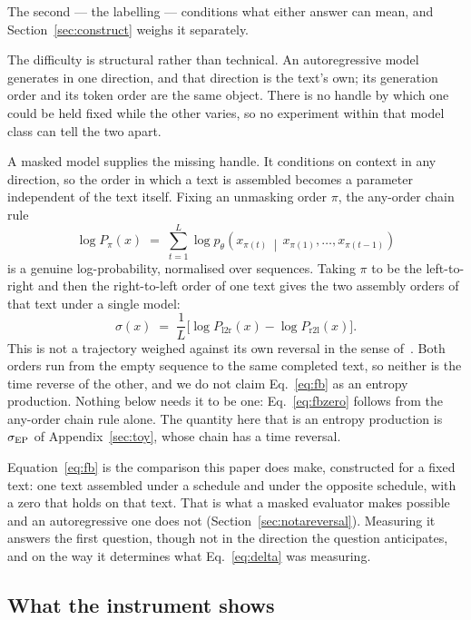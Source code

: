 The second --- the labelling --- conditions what either answer can mean,
and Section~\ref{sec:construct} weighs it separately.

The difficulty is structural rather than technical.  An autoregressive model
generates in one direction, and that direction is the text's own; its
generation order and its token order are the same object.  There is no handle
by which one could be held fixed while the other varies, so no experiment
within that model class can tell the two apart.

A masked model supplies the missing handle.  It conditions on context in any
direction, so the order in which a text is assembled becomes a parameter
independent of the text itself.  Fixing an unmasking order $\pi$, the
any-order chain rule
\begin{equation}
\log P_\pi(x) \;=\; \sum_{t=1}^{L}
   \log p_\theta\!\left( x_{\pi(t)} \,\middle|\, x_{\pi(1)}, \ldots,
                         x_{\pi(t-1)} \right)
\label{eq:aoar}
\end{equation}
is a genuine log-probability, normalised over sequences.  Taking $\pi$ to be
the left-to-right and then the right-to-left order of one text gives the
two assembly orders of that text under a single model:
\begin{equation}
\sigma(x) \;=\; \frac{1}{L}
   \bigl[ \log P_{\mathrm{l2r}}(x) - \log P_{\mathrm{r2l}}(x) \bigr].
\label{eq:fb}
\end{equation}
This is not a trajectory weighed against its own reversal in the sense
of~\cite{jarzynski1997, crooks1999, seifert2012}.  Both orders run from
the empty sequence to the same completed text, so neither is the time
reverse of the other, and we do not claim Eq.~\eqref{eq:fb} as an entropy
production.  Nothing below needs it to be one: Eq.~\eqref{eq:fbzero}
follows from the any-order chain rule alone.  The quantity here that is an
entropy production is $\sigma_{\mathrm{EP}}$ of Appendix~\ref{sec:toy}, whose chain has
a time reversal.

Equation~\eqref{eq:fb} is the comparison this paper does make,
constructed for a fixed text: one text assembled under a schedule and
under the opposite schedule, with a zero that holds on that text.
That is what a masked evaluator makes possible and an autoregressive one
does not (Section~\ref{sec:notareversal}).  Measuring it answers the first
question, though not in the direction the question anticipates, and on the
way it determines what Eq.~\eqref{eq:delta} was measuring.

\subsection*{What the instrument shows}

